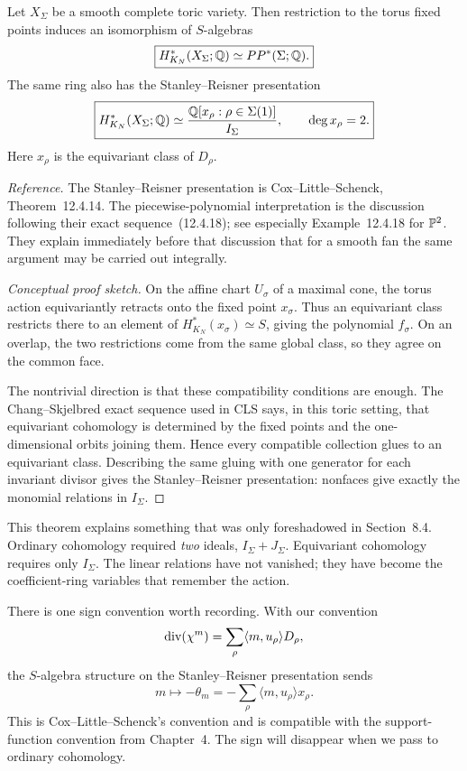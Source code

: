 \begin{theorem}
\label{thm:equivariant-piecewise-polynomial}
Let \(X_\Sigma\) be a smooth complete toric variety. Then restriction
to the torus fixed points induces an isomorphism of \(S\)-algebras
\[
\boxed{
H_{K_N}^*(X_\Sigma;\mathbb{Q})
\simeq
PP^*(\Sigma;\mathbb{Q}).
}
\]
The same ring also has the Stanley--Reisner presentation
\[
\boxed{
H_{K_N}^*(X_\Sigma;\mathbb{Q})
\simeq
\frac{\mathbb{Q}[x_\rho:\rho\in\Sigma(1)]}{I_\Sigma},
\qquad
\deg x_\rho=2.
}
\]
Here \(x_\rho\) is the equivariant class of \(D_\rho\).
\end{theorem}

\noindent
\textit{Reference.}
The Stanley--Reisner presentation is Cox--Little--Schenck,
Theorem~12.4.14. The piecewise-polynomial interpretation is the
discussion following their exact sequence~(12.4.18); see especially
Example~12.4.18 for \(\mathbb{P}^2\). They explain immediately before that
discussion that for a smooth fan the same argument may be carried out
integrally.

\begin{proof}[Conceptual proof sketch]
On the affine chart \(U_\sigma\) of a maximal cone, the torus action
equivariantly retracts onto the fixed point \(x_\sigma\). Thus an
equivariant class restricts there to an element of
\(H_{K_N}^*(x_\sigma)\simeq S\), giving the polynomial \(f_\sigma\).
On an overlap, the two restrictions come from the same global class,
so they agree on the common face.

The nontrivial direction is that these compatibility conditions are
enough. The Chang--Skjelbred exact sequence used in CLS says, in this
toric setting, that equivariant cohomology is determined by the fixed
points and the one-dimensional orbits joining them. Hence every
compatible collection glues to an equivariant class. Describing the
same gluing with one generator for each invariant divisor gives the
Stanley--Reisner presentation: nonfaces give exactly the monomial
relations in \(I_\Sigma\).
\end{proof}

This theorem explains something that was only foreshadowed in
Section~8.4. Ordinary cohomology required \emph{two} ideals,
\(I_\Sigma+J_\Sigma\). Equivariant cohomology requires only
\(I_\Sigma\). The linear relations have not vanished; they have become
the coefficient-ring variables that remember the action.

There is one sign convention worth recording. With our convention
\[
\operatorname{div}(\chi^{m})
=
\sum_\rho\langle m,u_\rho\rangle D_\rho,
\]
the \(S\)-algebra structure on the Stanley--Reisner presentation sends
\[
m
\longmapsto
-\theta_m
=
-\sum_\rho\langle m,u_\rho\rangle x_\rho.
\]
This is Cox--Little--Schenck's convention and is compatible with the
support-function convention from Chapter~4. The sign will disappear
when we pass to ordinary cohomology.

